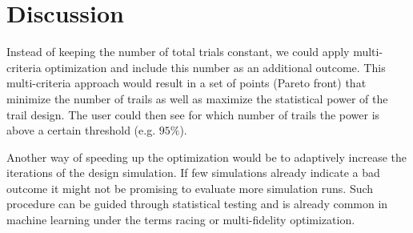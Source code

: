 \documentclass[bimj,fleqn]{w-art}
\theoremstyle{plain}
\theoremstyle{definition}
\begin{document}



\section{Discussion}
\label{sec:discussion}



Instead of keeping the number of total trials constant, we could apply multi-criteria optimization and include this number as an additional outcome.
This multi-criteria approach would result in a set of points (Pareto front) that minimize the number of trails as well as maximize the statistical power of the trail design.
The user could then see for which number of trails the power is above a certain threshold (e.g. $95\%$).

Another way of speeding up the optimization would be to adaptively increase the iterations of the design simulation. 
If few simulations already indicate a bad outcome it might not be promising to evaluate more simulation runs.
Such procedure can be guided through statistical testing and is already common in machine learning under the terms racing or multi-fidelity optimization.

\end{document}
